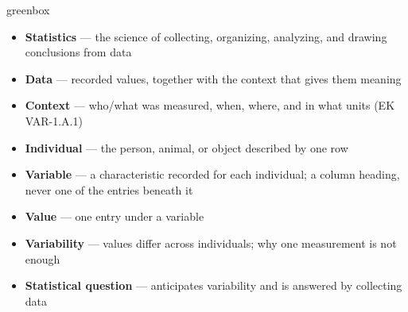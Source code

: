 \documentclass[10pt]{article}
\begin{document}
\boxguard
\begin{skillbox}{greenbox}
\begin{minipage}[t]{0.48\linewidth}
    \begin{itemize}
        \item \textbf{Statistics} --- the science of collecting, organizing, analyzing, and
              drawing conclusions from data
        \item \textbf{Data} --- recorded values, together with the context that gives them meaning
        \item \textbf{Context} --- who/what was measured, when, where, and in what units
              (EK VAR-1.A.1)
        \item \textbf{Individual} --- the person, animal, or object described by one row
    \end{itemize}
\end{minipage}
\hfill
\begin{minipage}[t]{0.48\linewidth}
    \begin{itemize}
        \item \textbf{Variable} --- a characteristic recorded for each individual; a column
              heading, never one of the entries beneath it
        \item \textbf{Value} --- one entry under a variable
        \item \textbf{Variability} --- values differ across individuals; why one measurement
              is not enough
        \item \textbf{Statistical question} --- anticipates variability and is answered by
              collecting data
    \end{itemize}
\end{minipage}
\end{skillbox}
\end{document}

